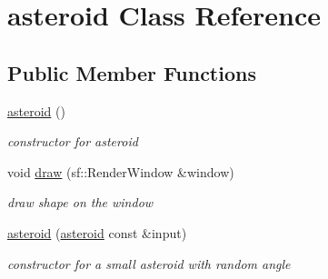 \hypertarget{classasteroid}{}\section{asteroid Class Reference}
\label{classasteroid}
\subsection*{Public Member Functions}
\begin{DoxyCompactItemize}
\item 
\mbox{\label{classasteroid_a82f5b1b37e8b07955250d91c78477d25}} 
\mbox{\hyperlink{classasteroid_a82f5b1b37e8b07955250d91c78477d25}{asteroid}} ()
\begin{DoxyCompactList}\small\item\em constructor for asteroid \end{DoxyCompactList}\item 
\mbox{\label{classasteroid_aef1338e61f0b16bb1cea36cec9053e2c}} 
void \mbox{\hyperlink{classasteroid_aef1338e61f0b16bb1cea36cec9053e2c}{draw}} (sf\+::\+Render\+Window \&window)
\begin{DoxyCompactList}\small\item\em draw shape on the window \end{DoxyCompactList}\item 
\mbox{\label{classasteroid_a5f30fd5c5bfa4564cef7a19dd98dae31}} 
\mbox{\hyperlink{classasteroid_a5f30fd5c5bfa4564cef7a19dd98dae31}{asteroid}} (\mbox{\hyperlink{classasteroid}{asteroid}} const \&input)
\begin{DoxyCompactList}\small\item\em constructor for a small asteroid with random angle \end{DoxyCompactList}\end{DoxyCompactItemize}
